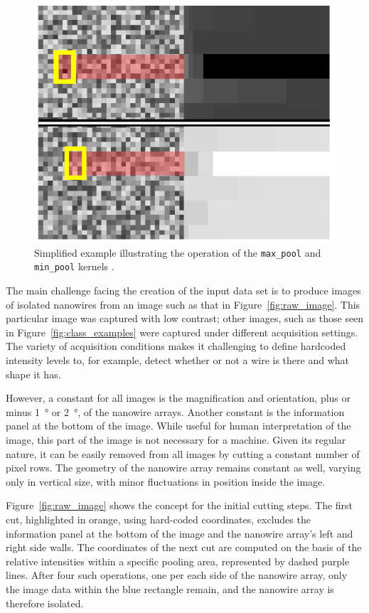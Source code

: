 \begin{figure}
    \centering
    \includegraphics{5_Yield_Analysis/Fig/min_max_pool.pdf}
    \caption[Simplified example illustrating the operation of the \texttt{max\_pool} and \texttt{min\_pool} kernels.]{Simplified example illustrating the operation of the \texttt{max\_pool} and \texttt{min\_pool} kernels \cite{Brugnolotto2024}.}
    \label{fig:min_max_pool}
\end{figure}

The main challenge facing the creation of the input data set is to produce images of isolated nanowires from an image such as that in Figure~\ref{fig:raw_image}. This particular image was captured with low contrast; other images, such as those seen in Figure~\ref{fig:class_examples} were captured under different acquisition settings. The variety of acquisition conditions makes it challenging to define hardcoded intensity levels to, for example, detect whether or not a wire is there and what shape it has.

However, a constant for all images is the magnification and orientation, plus or minus \qty{1}{\degree} or \qty{2}{\degree}, of the nanowire arrays. Another constant is the information panel at the bottom of the image. While useful for human interpretation of the image, this part of the image is not necessary for a machine. Given its regular nature, it can be easily removed from all images by cutting a constant number of pixel rows. The geometry of the nanowire array remains constant as well, varying only in vertical size, with minor fluctuations in position inside the image.

Figure~\ref{fig:raw_image} shows the concept for the initial cutting steps. The first cut, highlighted in orange, using hard-coded coordinates, excludes the information panel at the bottom of the image and the nanowire array's left and right side walls. The coordinates of the next cut are computed on the basis of the relative intensities within a specific pooling area, represented by dashed purple lines. After four such operations, one per each side of the nanowire array, only the image data within the blue rectangle remain, and the nanowire array is therefore isolated.

